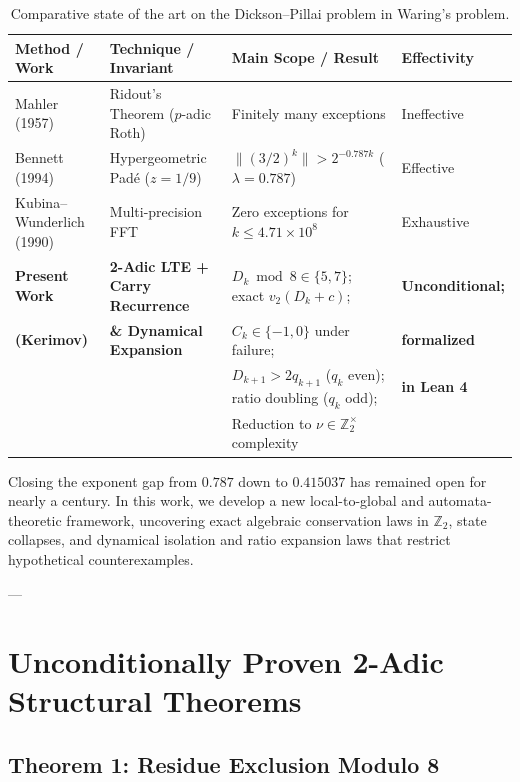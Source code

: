 \documentclass[11pt,reqno]{amsart}
\theoremstyle{definition}
\numberwithin{equation}{section}
\begin{document}
\begin{table}[htbp]
\centering
\small
\begin{tabular}{>{\raggedright\arraybackslash}p{}>{\raggedright\arraybackslash}p{}>{\raggedright\arraybackslash}p{}>{\raggedright\arraybackslash}p{}}
\toprule
\textbf{Method / Work} & \textbf{Technique / Invariant} & \textbf{Main Scope / Result} & \textbf{Effectivity} \\
\midrule
Mahler (1957) \cite{mahler1957} & Ridout's Theorem ($p$-adic Roth) & Finitely many exceptions & Ineffective \\
\addlinespace[2pt]
Bennett (1994) \cite{bennett1994} & Hypergeometric Padé ($z = 1/9$) & $\|(3/2)^k\| > 2^{-0.787 k}$ ($\lambda = 0.787$) & Effective \\
\addlinespace[2pt]
Kubina--Wunderlich (1990) \cite{kubina1990} & Multi-precision FFT & Zero exceptions for $k \le 4.71 \times 10^8$ & Exhaustive \\
\midrule
\textbf{Present Work} & \textbf{2-Adic LTE + Carry Recurrence} & $D_k \bmod 8 \in \{5, 7\}$; exact $v_2(D_k+c)$; & \textbf{Unconditional;} \\
\textbf{(Kerimov)} & \textbf{\& Dynamical Expansion} & $C_k \in \{-1, 0\}$ under failure; & \textbf{formalized} \\
 & & $D_{k+1} > 2 q_{k+1}$ ($q_k$ even); ratio doubling ($q_k$ odd); & \textbf{in Lean 4} \\
 & & Reduction to $\nu \in \mathbb{Z}_2^\times$ complexity & \\
\bottomrule
\end{tabular}
\caption{Comparative state of the art on the Dickson--Pillai problem in Waring's problem.}\label{tab:comparison}
\end{table}

Closing the exponent gap from $0.787$ down to $0.415037$ has remained open for nearly a century. In this work, we develop a new local-to-global and automata-theoretic framework, uncovering exact algebraic conservation laws in $\mathbb{Z}_2$, state collapses, and dynamical isolation and ratio expansion laws that restrict hypothetical counterexamples.

---

\section{Unconditionally Proven 2-Adic Structural Theorems}

\subsection{Theorem 1: Residue Exclusion Modulo 8}
\end{document}
